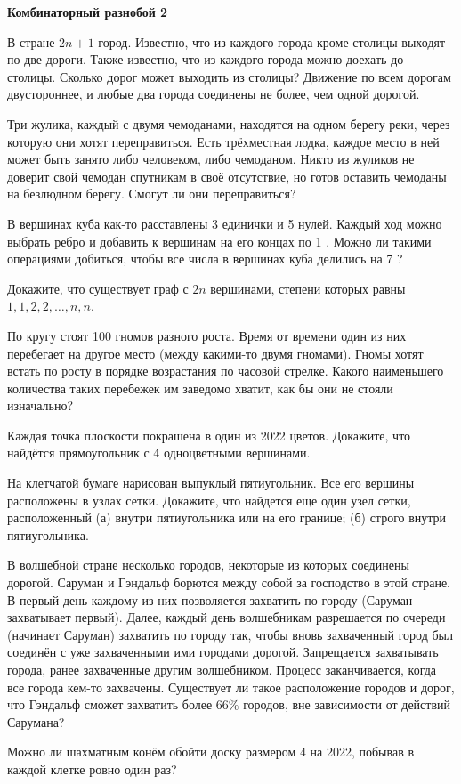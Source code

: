 \centerline{\bf \Huge Комбинаторный разнобой 2}

В стране $2 n+1$ город. Известно, что из каждого города кроме столицы выходят по две дороги. Также известно, что из каждого города можно доехать до столицы. Сколько дорог может выходить из столицы? Движение по всем дорогам двустороннее, и любые два города соединены не более, чем одной дорогой.

Три жулика, каждый с двумя чемоданами, находятся на одном берегу реки, через которую они хотят переправиться. Есть трёхместная лодка, каждое место в ней может быть занято либо человеком, либо чемоданом. Никто из жуликов не доверит свой чемодан спутникам в своё отсутствие, но готов оставить чемоданы на безлюдном берегу. Смогут ли они переправиться?

В вершинах куба как-то расставлены 3 единички и 5 нулей. Каждый ход можно выбрать ребро и добавить к вершинам на его концах по 1 . Можно ли такими операциями добиться, чтобы все числа в вершинах куба делились на 7 ?

Докажите, что существует граф с $2 n$ вершинами, степени которых равны $1,1,2,2, \ldots, n, n$.

По кругу стоят 100 гномов разного роста. Время от времени один из них перебегает на другое место (между какими-то двумя гномами). Гномы хотят встать по росту в порядке возрастания по часовой стрелке. Какого наименьшего количества таких перебежек им заведомо хватит, как бы они не стояли изначально?

Каждая точка плоскости покрашена в один из 2022 цветов. Докажите, что найдётся прямоугольник с 4 одноцветными вершинами.

На клетчатой бумаге нарисован выпуклый пятиугольник. Все его вершины расположены в узлах сетки. Докажите, что найдется еще один узел сетки, расположенный (а) внутри пятиугольника или на его границе; (б) строго внутри пятиугольника.

В волшебной стране несколько городов, некоторые из которых соединены дорогой. Саруман и Гэндальф борются между собой за господство в этой стране. В первый день каждому из них позволяется захватить по городу (Саруман захватывает первый). Далее, каждый день волшебникам разрешается по очереди (начинает Саруман) захватить по городу так, чтобы вновь захваченный город был соединён с уже захваченными ими городами дорогой. Запрещается захватывать города, ранее захваченные другим волшебником. Процесс заканчивается, когда все города кем-то захвачены. Существует ли такое расположение городов и дорог, что Гэндальф сможет захватить более $66 \%$ городов, вне зависимости от действий Сарумана?

Можно ли шахматным конём обойти доску размером 4 на 2022, побывав в каждой клетке ровно один раз?